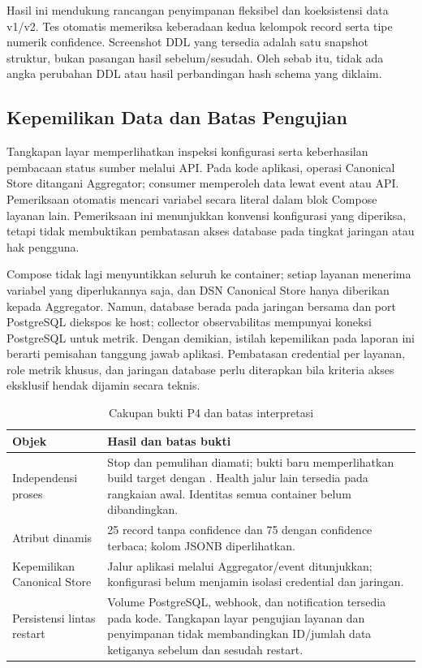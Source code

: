Hasil ini mendukung rancangan penyimpanan fleksibel dan koeksistensi data
v1/v2. Tes otomatis memeriksa keberadaan kedua kelompok record serta tipe
numerik confidence. Screenshot DDL yang tersedia adalah satu snapshot
struktur, bukan pasangan hasil sebelum/sesudah. Oleh sebab itu, tidak ada
angka perubahan DDL atau hasil perbandingan hash schema yang diklaim.

\subsection{Kepemilikan Data dan Batas Pengujian}

Tangkapan layar  memperlihatkan inspeksi konfigurasi serta keberhasilan
pembacaan status sumber melalui API. Pada kode aplikasi, operasi Canonical
Store ditangani Aggregator; consumer memperoleh data lewat event atau API.
Pemeriksaan otomatis mencari variabel  secara
literal dalam blok Compose layanan lain. Pemeriksaan ini menunjukkan
konvensi konfigurasi yang diperiksa, tetapi tidak membuktikan pembatasan
akses database pada tingkat jaringan atau hak pengguna.

Compose tidak lagi menyuntikkan seluruh  ke container; setiap
layanan menerima variabel yang diperlukannya saja, dan DSN Canonical Store
hanya diberikan kepada Aggregator. Namun, database berada pada jaringan bersama
dan port PostgreSQL diekspos ke host; collector observabilitas mempunyai
koneksi PostgreSQL untuk metrik. Dengan demikian, istilah kepemilikan
pada laporan ini berarti pemisahan tanggung jawab aplikasi. Pembatasan
credential per layanan, role metrik khusus, dan jaringan database perlu
diterapkan bila kriteria akses eksklusif hendak dijamin secara teknis.

\begin{table}[htbp]
    \centering
    \small
    \caption{Cakupan bukti P4 dan batas interpretasi}
    \begin{tabularx}{\textwidth}{@{}P{0.25\textwidth}X@{}}
        \toprule
        \textbf{Objek} & \textbf{Hasil dan batas bukti} \\
        \midrule
        Independensi proses & Stop dan pemulihan diamati; bukti baru memperlihatkan build target dengan . Health jalur lain tersedia pada rangkaian awal. Identitas semua container belum dibandingkan. \\
        Atribut dinamis & 25 record tanpa confidence dan 75 dengan confidence terbaca; kolom JSONB diperlihatkan. \\
        Kepemilikan Canonical Store & Jalur aplikasi melalui Aggregator/event ditunjukkan; konfigurasi belum menjamin isolasi credential dan jaringan. \\
        Persistensi lintas restart & Volume PostgreSQL, webhook, dan notification tersedia pada kode. Tangkapan layar pengujian layanan dan penyimpanan tidak membandingkan ID/jumlah data ketiganya sebelum dan sesudah restart. \\
        \bottomrule
    \end{tabularx}
\end{table}

